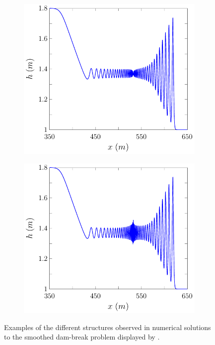 \begin{figure}
\begin{subfigure}{0.5\textwidth}
		\vspace{0.5cm}
	\end{subfigure}
	\begin{subfigure}{0.5\textwidth}
		\includegraphics[width=\textwidth]{./chp2/figures/DamBreakStruct/9.pdf}
		\vspace{0.5cm}
	\end{subfigure}%
	\begin{subfigure}{0.5\textwidth}
		\includegraphics[width=\textwidth]{./chp2/figures/DamBreakStruct/20.pdf}
		\vspace{0.5cm}
	\end{subfigure}
	\caption{Examples of the different structures observed in numerical solutions to the smoothed dam-break problem displayed by \citet{Pitt-2018-61}.}
	\label{fig:DBExAll}
\end{figure}

